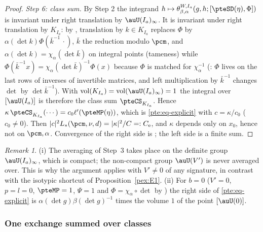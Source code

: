 \documentclass[10pt]{amsart}
\theoremstyle{definition}
\theoremstyle{remark}
\newtheorem{remark}[theorem]{Remark}
\begin{document}
\begin{proof}
\emph{Step 6: class sum.} By Step 2 the integrand $h\mapsto\theta^{W,I_a}_{\beta,\alpha}(g,h;
[\pteSD(\eta),\Phi])$ is invariant under right translation by $\auU(I_a)_\infty$. It is invariant under
right translation by $K_{I_a}$: by {\cite[Lemma~2.9]{P53}}, translation by $k\in K_{I_a}$ replaces $\Phi$
by $\alpha(\det k)\Phi(\bar k^{-1}\,\cdot)$, $\bar k$ the reduction modulo $\pcm$, and $\alpha(\det k)=
\chi_\alpha(\det\bar k)$ on integral points (tameness) while $\Phi(\bar k^{-1}x)=\chi_\alpha(\det\bar k)^{-1}
\Phi(x)$ because $\Phi$ is matched for $\chi_\alpha^{-1}$ ({\cite[Definition~3.1]{P53}}: $\Phi$
lives on the last rows of inverses of invertible matrices, and left multiplication by $\bar k^{-1}$
changes $\det$ by $\det\bar k^{-1}$). With $\mathrm{vol}(K_{I_a})=\mathrm{vol}(\auU(I_a)_\infty)=1$ the
integral over $[\auU(I_a)]$ is therefore the class sum $\pteCS_{K_{I_a}}$. Hence
$\kappa\,\pteCS_{K_{I_a}}(\cdots)=c_0\ell'(\pteMP(\eta))$, which is \eqref{pte:eq-explicit} with
$c=\kappa/c_0$ ($c_0\ne0$). Then $|c|^2L_*(\pcm,\nu,d)=|\kappa|^2/C=:C_{\mathrm e}$, and $\kappa$ depends
only on $x_0$, hence not on $\pcm,\alpha$. Convergence of the right side is {\cite[Corollary~3.34]{P53}}; the
left side is a finite sum.
\end{proof}

\begin{remark}\label{pte:rem-explicit}
(i) The averaging of Step~3 takes place on the definite group $\auU(I_a)_\infty$, which is compact;
the non-compact group $\auU(V')$ is never averaged over. This is why the argument applies with
$V'\ne0$ of any signature, in contrast with the isotypic shortcut of Proposition~\ref{pex:E1}. (ii)
For $b=0$ ($V'=0$, $p=l=0$, $\pteMP=1$, $\Psi=1$ and $\Phi=\chi_\alpha\circ\det$ by
{\cite[Definition~3.1]{P53}}) the right side of \eqref{pte:eq-explicit} is $\alpha(\det g)\beta(\det
g)^{-1}$ times the volume $1$ of the point $[\auU(0)]$.
\end{remark}

\subsubsection{One exchange summed over classes}\label{pte:ss-one}
\end{document}
